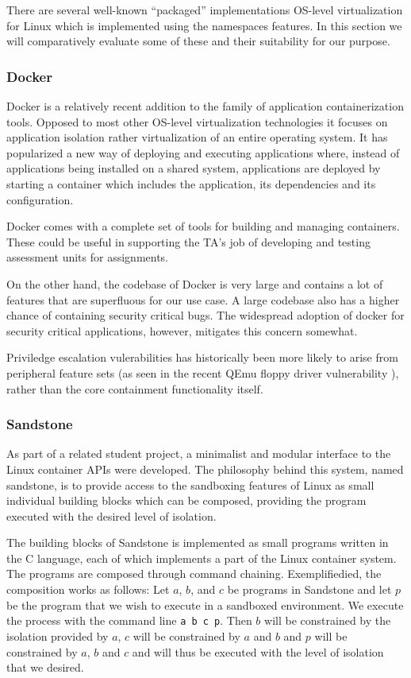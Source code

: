 There are several well-known "`packaged"' implementations OS-level
virtualization for Linux which is implemented using the namespaces
features. In this section we will comparatively evaluate some of these
and their suitability for our purpose.


\subsubsection{Docker}
Docker is a relatively recent addition to the family of application
containerization tools. Opposed to most other OS-level virtualization
technologies it focuses on application isolation rather
virtualization of an entire operating system. It has popularized a new
way of deploying and executing applications where, instead of
applications being installed on a shared system, applications are
deployed by starting a container which includes the application, its
dependencies and its configuration. \cite{whatisdocker}

Docker comes with a complete set of tools for building and managing
containers. These could be useful in supporting the TA's job of
developing and testing assessment units for assignments.

On the other hand, the codebase of Docker is very large and
contains a lot of features that are superfluous for our use
case. A large codebase also has a higher chance of containing security
critical bugs. The widespread adoption of docker for security critical
applications, however, mitigates this concern somewhat.

Priviledge escalation vulerabilities has historically been more likely
to arise from peripheral feature sets (as seen in the recent QEmu
floppy driver vulnerability \cite{CVE-2015-3456}), rather than the core containment
functionality itself.



\subsubsection{Sandstone}
As part of a related student project, a minimalist and modular
interface to the Linux container APIs were developed. The philosophy
behind this system, named sandstone, is to provide access to
the sandboxing features of Linux as small individual building blocks
which can be composed, providing the program executed with the
desired level of isolation.

The building blocks of Sandstone is implemented as small programs
written in the C language, each of which implements a part of the
Linux container system. The programs are composed through command
chaining. Exemplifiedied, the composition works as follows: Let $a$,
$b$, and $c$ be programs in Sandstone and let $p$ be the program that
we wish to execute in a sandboxed environment. We execute the process
with the command line \texttt{a b c p}. Then $b$ will be constrained
by the isolation provided by $a$, $c$ will be constrained by $a$ and
$b$ and $p$ will be constrained by $a$, $b$ and $c$ and will thus be
executed with the level of isolation that we desired. \cite{onlineta}


